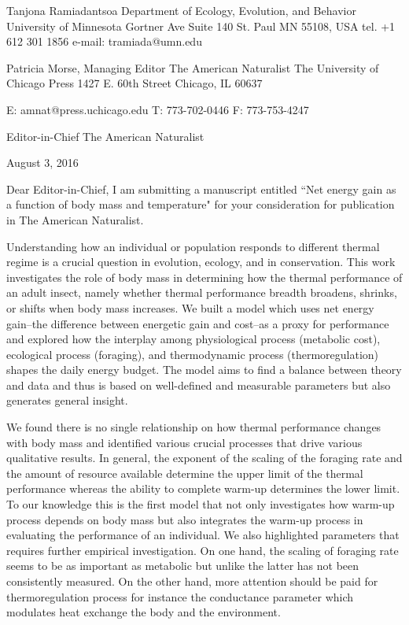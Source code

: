 Tanjona Ramiadantsoa \newline
Department of Ecology, Evolution, and Behavior \newline
University of Minnesota  Gortner Ave Suite 140 \newline
St. Paul MN 55108, USA \newline
tel. +1 612 301 1856 \newline
e-mail: tramiada@umn.edu \newline


Patricia Morse, Managing Editor
The American Naturalist
The University of Chicago Press
1427 E. 60th Street
Chicago, IL 60637

E: amnat@press.uchicago.edu
T: 773-702-0446
F: 773-753-4247


Editor-in-Chief \newline
The American Naturalist  \newline \newline

August 3, 2016 \newline \newline

Dear Editor-in-Chief, \newline
I am submitting a manuscript entitled ``Net energy gain as a function of body mass and temperature" for your consideration for publication in The American Naturalist.

Understanding how an individual or population responds to different thermal regime is a crucial question in evolution, ecology, and in conservation.
This work investigates the role of body mass in determining how the thermal performance of an adult insect, namely whether thermal performance breadth broadens, shrinks, or shifts when body mass increases.
We built a model which uses net energy gain--the difference between energetic gain and cost--as a proxy for performance and explored how the interplay among physiological process (metabolic cost), ecological process (foraging), and thermodynamic process (thermoregulation) shapes the daily energy budget.
The model aims to find a balance between theory and data and thus is based on well-defined and measurable parameters but also generates general insight.

We found there is no single relationship on how thermal performance changes with body mass and identified various crucial processes that drive various qualitative results.
In general, the exponent of the scaling of the foraging rate and the amount of resource available determine the upper limit of the thermal performance whereas the ability to complete warm-up determines the lower limit.
To our knowledge this is the first model that not only investigates how warm-up process depends on body mass but also integrates the warm-up process in evaluating the performance of an individual.
We also highlighted parameters that requires further empirical investigation.
On one hand, the scaling of foraging rate seems to be as important as metabolic but unlike the latter has not been consistently measured.
On the other hand, more attention should be paid for thermoregulation process for instance the conductance parameter which modulates heat exchange the body and the environment.

